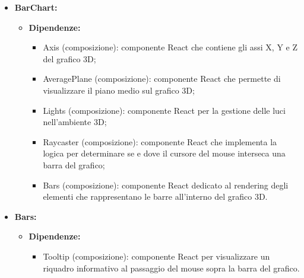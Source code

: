 \begin{itemize}
    \item \textbf{BarChart:}
          \begin{itemize}
              \item \textbf{Dipendenze:}
                    \begin{itemize}
                        \item Axis (composizione): componente React che contiene gli assi X, Y e Z del
                              grafico 3D;
                        \item AveragePlane (composizione): componente React che permette di visualizzare il
                              piano medio sul grafico 3D;
                        \item Lights (composizione): componente React per la gestione delle luci
                              nell'ambiente 3D;
                        \item Raycaster (composizione): componente React che implementa la logica per
                              determinare se e dove il cursore del mouse interseca una barra del grafico;
                        \item Bars (composizione): componente React dedicato al rendering degli elementi che
                              rappresentano le barre all'interno del grafico 3D.
                    \end{itemize}
          \end{itemize}

    \item \textbf{Bars:}
          \begin{itemize}
              \item \textbf{Dipendenze:}
                    \begin{itemize}
                        \item Tooltip (composizione): componente React per visualizzare un riquadro
                              informativo al passaggio del mouse sopra la barra del grafico.
                    \end{itemize}
          \end{itemize}
\end{itemize}

